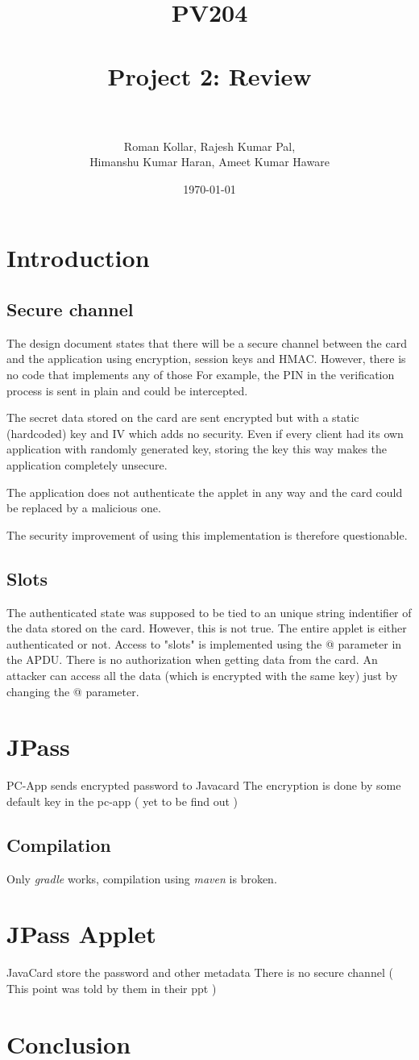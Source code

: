 \documentclass[paper=a4, fontsize=12pt]{scrartcl}
\title{
\normalfont \normalsize
\textsc{PV204} \\ [25pt]
\horrule{0.5pt} \\[0.4cm]
\huge Project 2: Review  \\
\horrule{2pt} \\[0.5cm]
}
\author{Roman Kollar, Rajesh Kumar Pal,\\Himanshu Kumar Haran, Ameet Kumar Haware}
\date{\normalsize\today}
\begin{document}
\maketitle

\section{Introduction}
\subsection{Secure channel}
The design document states that there will be a secure channel between the card and the application using encryption, session keys and HMAC.
However, there is no code that implements any of those
For example, the PIN in the verification process is sent in plain and could be intercepted.

The secret data stored on the card are sent encrypted but with a static (hardcoded) key and IV which adds no security.
Even if every client had its own application with randomly generated key, storing the key this way makes the application completely unsecure.

The application does not authenticate the applet in any way and the card could be replaced by a malicious one.

The security improvement of using this implementation is therefore questionable.

\subsection{Slots}
The authenticated state was supposed to be tied to an unique string indentifier of the data stored on the card.
However, this is not true.
The entire applet is either authenticated or not.
Access to "slots" is implemented using the @ parameter in the APDU.
There is no authorization when getting data from the card.
An attacker can access all the data (which is encrypted with the same key) just by changing the @ parameter.

\section{JPass}
PC-App sends encrypted password to Javacard
The encryption is done by some default key in the pc-app ( yet to be find out )
\subsection{Compilation}
Only \emph{gradle} works, compilation using \emph{maven} is broken.

\section{JPass Applet}
JavaCard store the password and other metadata
There is no secure channel ( This point was told by them in their ppt )

\section{Conclusion}
\end{document}
